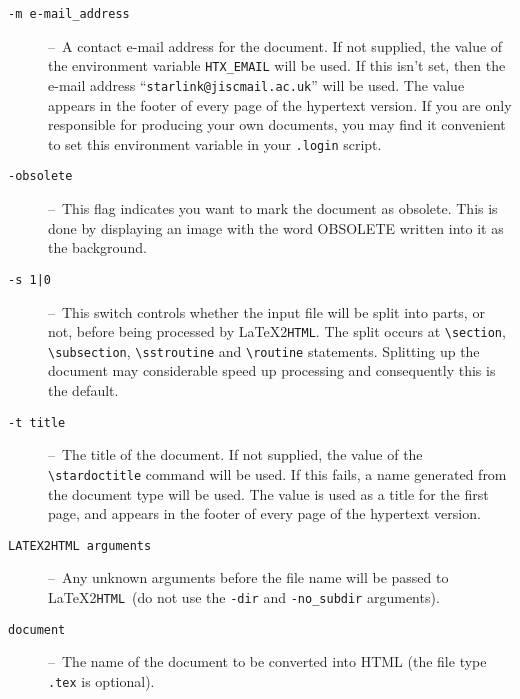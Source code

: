 \documentclass[twoside,11pt,nolof]{starlink}
\providecommand{\dash}{--}
\providecommand{\latextohtml}{\LaTeX2\texttt{HTML}}
\begin{document}
\begin{description}
\item[\texttt{-m e-mail\_address}] \dash\
   A contact e-mail address for the document.
   If not supplied, the value of the environment variable
   \verb#HTX_EMAIL# will be used.
   If this isn't set, then the e-mail address
   ``\texttt{starlink@jiscmail.ac.uk}'' will be used.
   The value appears in the footer of every page of the hypertext version.
   If you are only responsible for producing your own documents, you may find
   it convenient to set this environment variable in your \texttt{.login}
   script.

\item[\texttt{-obsolete}] \dash\
   This flag indicates you want to mark the document as obsolete. This is
   done by displaying an image with the word OBSOLETE written into it as
   the background.

\item[\texttt{-s 1|0}] \dash\
   This switch controls whether the input file will be split
   into parts, or not, before being processed by \latextohtml.
   The split occurs at \verb#\section#, \verb#\subsection#,
   \verb#\sstroutine# and \verb#\routine# statements.
   Splitting up the document may considerable speed up processing and
   consequently this is the default.

\item[\texttt{-t title}] \dash\
   The title of the document.
   If not supplied, the value of the \verb#\stardoctitle# command will be used.
   If this fails, a name generated from the document type will be used.
   The value is used as a title for the first page, and appears in the footer of
   every page of the hypertext version.

\item[\texttt{LATEX2HTML arguments}] \dash\
   Any unknown arguments before the file name will be passed to \latextohtml\
   (do not use the \verb#-dir# and \verb#-no_subdir# arguments).

\item[\texttt{document}] \dash\
   The name of the document to be converted into HTML (the file type
   \texttt{.tex} is optional).

\end{description}
\end{document}
